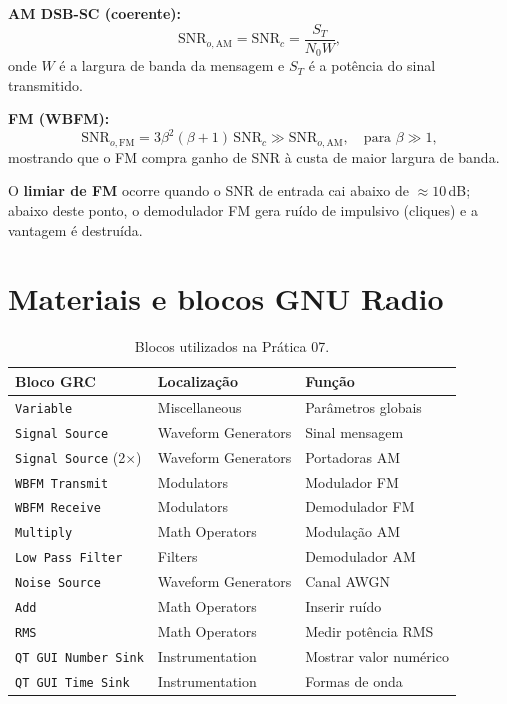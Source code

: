 \documentclass[11pt,a4paper]{article}
\begin{document}
\textbf{AM DSB-SC (coerente):}
\begin{equation}
  \text{SNR}_{o,\text{AM}} = \text{SNR}_c = \frac{S_T}{N_0 W},
\end{equation}
onde $W$ é a largura de banda da mensagem e $S_T$ é a potência do sinal
transmitido.

\textbf{FM (WBFM):}
\begin{equation}
  \text{SNR}_{o,\text{FM}} = 3\beta^2(\beta + 1)\,\text{SNR}_c \gg \text{SNR}_{o,\text{AM}},
  \quad \text{para } \beta \gg 1,
\end{equation}
mostrando que o FM compra ganho de SNR à custa de maior largura de banda.

O \textbf{limiar de FM} ocorre quando o SNR de entrada cai abaixo de
$\approx 10$\,dB; abaixo deste ponto, o demodulador FM gera ruído de
impulsivo (cliques) e a vantagem é destruída.

\section{Materiais e blocos GNU Radio}

\begin{table}[H]
  \centering
  \begin{tabular}{l l l}
    \toprule
    \textbf{Bloco GRC} & \textbf{Localização} & \textbf{Função} \\
    \midrule
    \texttt{Variable}              & Miscellaneous        & Parâmetros globais \\
    \texttt{Signal Source}         & Waveform Generators  & Sinal mensagem \\
    \texttt{Signal Source} (2×)    & Waveform Generators  & Portadoras AM \\
    \texttt{WBFM Transmit}         & Modulators           & Modulador FM \\
    \texttt{WBFM Receive}          & Modulators           & Demodulador FM \\
    \texttt{Multiply}              & Math Operators       & Modulação AM \\
    \texttt{Low Pass Filter}       & Filters              & Demodulador AM \\
    \texttt{Noise Source}          & Waveform Generators  & Canal AWGN \\
    \texttt{Add}                   & Math Operators       & Inserir ruído \\
    \texttt{RMS}                   & Math Operators       & Medir potência RMS \\
    \texttt{QT GUI Number Sink}    & Instrumentation      & Mostrar valor numérico \\
    \texttt{QT GUI Time Sink}      & Instrumentation      & Formas de onda \\
    \bottomrule
  \end{tabular}
  \caption{Blocos utilizados na Prática 07.}
\end{table}
\end{document}
